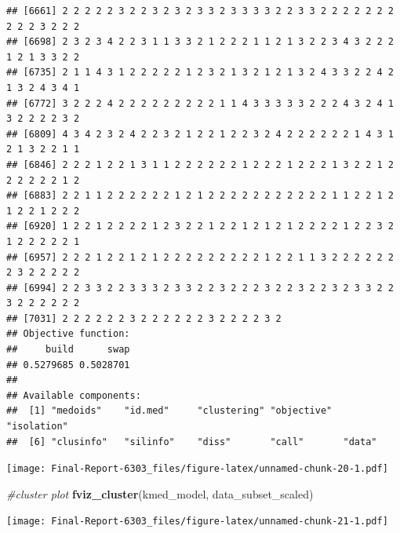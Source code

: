\documentclass[
]{article}
\newenvironment{Shaded}{\begin{snugshade}}{\end{snugshade}}
\newcommand{\AttributeTok}[1]{\textcolor[rgb]{0.13,0.29,0.53}{#1}}
\newcommand{\CommentTok}[1]{\textcolor[rgb]{0.56,0.35,0.01}{\textit{#1}}}
\newcommand{\DecValTok}[1]{\textcolor[rgb]{0.00,0.00,0.81}{#1}}
\newcommand{\FunctionTok}[1]{\textcolor[rgb]{0.13,0.29,0.53}{\textbf{#1}}}
\newcommand{\NormalTok}[1]{#1}
\newcommand{\OtherTok}[1]{\textcolor[rgb]{0.56,0.35,0.01}{#1}}
\newcommand{\SpecialCharTok}[1]{\textcolor[rgb]{0.81,0.36,0.00}{\textbf{#1}}}
\newcommand{\StringTok}[1]{\textcolor[rgb]{0.31,0.60,0.02}{#1}}
\begin{document}
\begin{verbatim}
## [6661] 2 2 2 2 2 3 2 2 3 2 3 2 3 3 2 3 3 3 3 2 2 3 3 2 2 2 2 2 2 2 2 2 2 3 2 2 2
## [6698] 2 3 2 3 4 2 2 3 1 1 3 3 2 1 2 2 2 1 1 2 1 3 2 2 3 4 3 2 2 2 1 2 1 3 3 2 2
## [6735] 2 1 1 4 3 1 2 2 2 2 2 1 2 3 2 1 3 2 1 2 1 3 2 4 3 3 2 2 4 2 1 3 2 4 3 4 1
## [6772] 3 2 2 2 4 2 2 2 2 2 2 2 2 2 1 1 4 3 3 3 3 3 2 2 2 4 3 2 4 1 3 2 2 2 2 3 2
## [6809] 4 3 4 2 3 2 4 2 2 3 2 1 2 2 1 2 2 3 2 4 2 2 2 2 2 2 1 4 3 1 2 1 3 2 2 1 1
## [6846] 2 2 2 1 2 2 1 3 1 1 2 2 2 2 2 2 1 2 2 2 1 2 2 2 1 3 2 2 1 2 2 2 2 2 2 1 2
## [6883] 2 2 1 1 2 2 2 2 2 2 1 2 1 2 2 2 2 2 2 2 2 2 2 2 1 1 2 2 1 2 1 2 2 1 2 2 2
## [6920] 1 2 2 1 2 2 2 2 1 2 3 2 2 1 2 2 1 2 1 2 1 2 2 2 2 1 2 2 3 2 1 2 2 2 2 2 1
## [6957] 2 2 2 1 2 2 1 2 1 2 2 2 2 2 2 2 2 2 1 2 2 1 1 3 2 2 2 2 2 2 2 3 2 2 2 2 2
## [6994] 2 2 3 3 2 2 3 3 3 2 3 3 2 2 3 2 2 2 3 2 2 3 2 2 3 2 3 3 2 2 3 2 2 2 2 2 2
## [7031] 2 2 2 2 2 2 3 2 2 2 2 2 2 3 2 2 2 2 3 2
## Objective function:
##     build      swap 
## 0.5279685 0.5028701 
## 
## Available components:
##  [1] "medoids"    "id.med"     "clustering" "objective"  "isolation" 
##  [6] "clusinfo"   "silinfo"    "diss"       "call"       "data"
\end{verbatim}

\begin{Shaded}
\end{Shaded}

\texttt{[image: Final-Report-6303\_files/figure-latex/unnamed-chunk-20-1.pdf]}

\begin{Shaded}
\begin{Highlighting}[]
\CommentTok{\#cluster plot}
\FunctionTok{fviz\_cluster}\NormalTok{(kmed\_model, data\_subset\_scaled)}
\end{Highlighting}
\end{Shaded}

\texttt{[image: Final-Report-6303\_files/figure-latex/unnamed-chunk-21-1.pdf]}

\begin{Shaded}
\end{Shaded}
\end{document}
